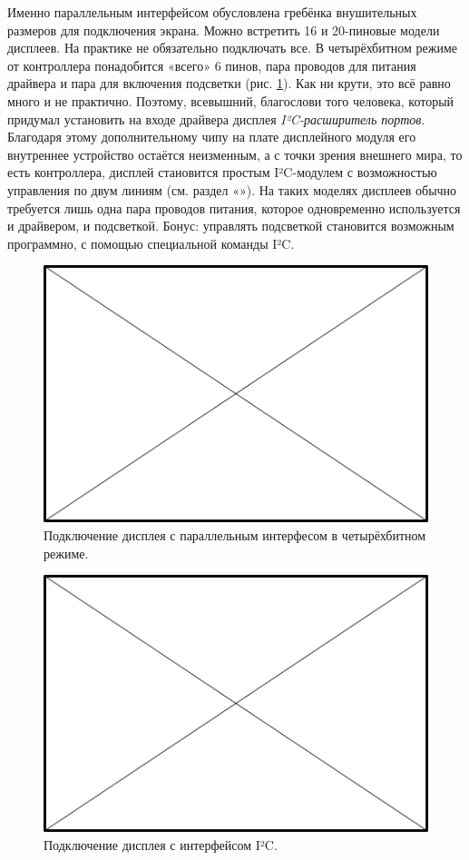 Именно параллельным интерфейсом обусловлена гребёнка внушительных размеров для подключения экрана. Можно встретить 16 и 20-пиновые модели дисплеев. На практике не обязательно подключать все. В четырёхбитном режиме от контроллера понадобится «всего» 6 пинов, пара проводов для питания драйвера и пара для включения подсветки (рис. \ref{fig:text-lcd-parallel-4}). Как ни крути, это всё равно много и не практично. Поэтому, всевышний, благослови того человека, который придумал установить на входе драйвера дисплея \emph{I²C-расширитель портов}. Благодаря этому дополнительному чипу на плате дисплейного модуля его внутреннее устройство остаётся неизменным, а с точки зрения внешнего мира, то есть контроллера, дисплей становится простым I²C-модулем с возможностью управления по двум линиям (см. раздел «»). На таких моделях дисплеев обычно требуется лишь одна пара проводов питания, которое одновременно используется и драйвером, и подсветкой. Бонус: управлять подсветкой становится возможным программно, с помощью специальной команды I²C.

\begin{figure}
  \centering
  \includegraphics{TODO}
  \caption{Подключение дисплея с параллельным интерфесом в четырёхбитном режиме.}
  \label{fig:text-lcd-parallel-4}
\end{figure}

\begin{figure}
  \centering
  \includegraphics{TODO}
  \caption{Подключение дисплея с интерфейсом I²C.}
  \label{fig:text-lcd-i2c}
\end{figure}

